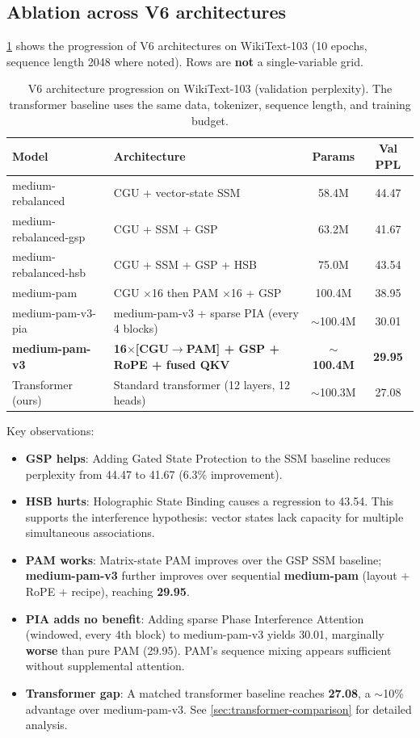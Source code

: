 \documentclass[11pt]{article}
\begin{document}
\subsection{Ablation across V6 architectures}
\label{sec:ablation}
\cref{tab:v6prog} shows the progression of V6 architectures on WikiText-103 (10 epochs, sequence length 2048 where noted). Rows are \textbf{not} a single-variable grid.

\begin{table}[t]
  \centering
  \caption{V6 architecture progression on WikiText-103 (validation perplexity). The transformer baseline uses the same data, tokenizer, sequence length, and training budget.}
  \label{tab:v6prog}
  \begin{tabular}{@{}>{\raggedright\arraybackslash}p{2.4cm} >{\raggedright\arraybackslash}p{5.4cm} cc@{}}
    \toprule
    Model & Architecture & Params & Val PPL \\
    \midrule
    medium-rebalanced & CGU + vector-state SSM & 58.4M & 44.47 \\
    medium-rebalanced-gsp & CGU + SSM + GSP & 63.2M & 41.67 \\
    medium-rebalanced-hsb & CGU + SSM + GSP + HSB & 75.0M & 43.54 \\
    medium-pam & CGU $\times$16 then PAM $\times$16 + GSP & 100.4M & 38.95 \\
    medium-pam-v3-pia & medium-pam-v3 + sparse PIA (every 4 blocks) & $\sim$100.4M & 30.01 \\
    \textbf{medium-pam-v3} & \textbf{16$\times$[CGU$\to$PAM] + GSP + RoPE + fused QKV} & \textbf{$\sim$100.4M} & \textbf{29.95} \\
    \midrule
    Transformer (ours) & Standard transformer (12 layers, 12 heads) & $\sim$100.3M & 27.08 \\
    \bottomrule
  \end{tabular}
\end{table}

Key observations:
\begin{itemize}
  \item \textbf{GSP helps}: Adding Gated State Protection to the SSM baseline reduces perplexity from 44.47 to 41.67 (6.3\% improvement).
  \item \textbf{HSB hurts}: Holographic State Binding causes a regression to 43.54. This supports the interference hypothesis: vector states lack capacity for multiple simultaneous associations.
  \item \textbf{PAM works}: Matrix-state PAM improves over the GSP SSM baseline; \textbf{medium-pam-v3} further improves over sequential \textbf{medium-pam} (layout + RoPE + recipe), reaching \textbf{29.95}.
  \item \textbf{PIA adds no benefit}: Adding sparse Phase Interference Attention (windowed, every 4th block) to medium-pam-v3 yields 30.01, marginally \textbf{worse} than pure PAM (29.95). PAM's sequence mixing appears sufficient without supplemental attention.
  \item \textbf{Transformer gap}: A matched transformer baseline reaches \textbf{27.08}, a $\sim$10\% advantage over medium-pam-v3. See \cref{sec:transformer-comparison} for detailed analysis.
\end{itemize}
\end{document}
